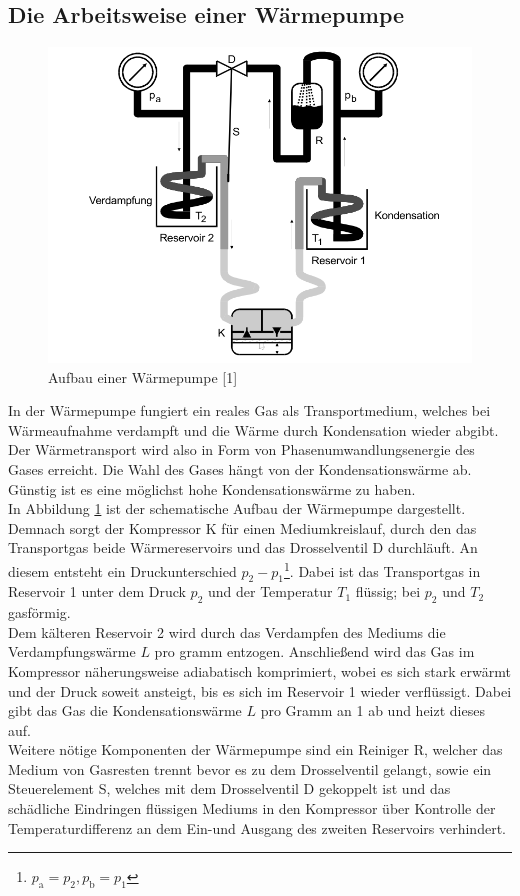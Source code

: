 \subsection{Die Arbeitsweise einer Wärmepumpe}
\begin{figure}
    \centering
    \includegraphics[scale=0.4]{aufbau.pdf}
    \caption{Aufbau einer Wärmepumpe [1]}
    \label{fig:aufbau}
\end{figure}
In der Wärmepumpe fungiert ein reales Gas als Transportmedium,
welches bei Wärmeaufnahme verdampft und die Wärme durch Kondensation wieder abgibt. Der Wärmetransport wird also in Form 
von Phasenumwandlungsenergie des Gases erreicht.
Die Wahl des Gases hängt von der Kondensationswärme ab. Günstig ist es eine möglichst hohe Kondensationswärme zu haben. \\
In Abbildung \ref{fig:aufbau} ist der schematische Aufbau der Wärmepumpe dargestellt.
Demnach sorgt der Kompressor K für einen Mediumkreislauf, durch den das Transportgas beide Wärmereservoirs und das Drosselventil D durchläuft.
An diesem entsteht ein Druckunterschied $p_2-p_1$\footnote{$p_\text{a}=p_2, p_\text{b}=p_1$}. Dabei ist das Transportgas in Reservoir 1 unter dem Druck $p_2$
und der Temperatur $T_1$ flüssig; bei $p_2$ und $T_2$ gasförmig.\\
Dem kälteren Reservoir 2 wird durch das Verdampfen des Mediums die Verdampfungswärme $L$ pro gramm entzogen. 
Anschließend wird das Gas im Kompressor näherungsweise adiabatisch komprimiert, wobei es sich stark erwärmt und der Druck soweit ansteigt, bis es sich im Reservoir 1
wieder verflüssigt. Dabei gibt das Gas die Kondensationswärme $L$ pro Gramm an 1 ab und heizt dieses auf.\\
Weitere nötige Komponenten der Wärmepumpe sind ein Reiniger R, welcher das Medium von Gasresten trennt bevor es zu dem Drosselventil gelangt, sowie ein Steuerelement S,
welches mit dem Drosselventil D gekoppelt ist und das schädliche Eindringen flüssigen Mediums in den Kompressor über Kontrolle der Temperaturdifferenz
an dem Ein-und Ausgang des zweiten Reservoirs verhindert. 
